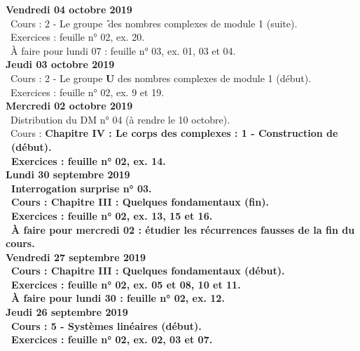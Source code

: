\documentclass[12pt,a4paper]{article}
\begin{document}
\noindent\textbf{Vendredi 04 octobre 2019}\\
\bu\ Cours : 2 - Le groupe \U\ des nombres complexes de module 1 (suite).\\
\bu\ Exercices : feuille n° 02, ex. 20.\\
\bu\ À faire pour lundi 07 : feuille n° 03, ex. 01, 03 et 04.\vspace{.4cm}\\ 

\noindent\textbf{Jeudi 03 octobre 2019}\\
\bu\ Cours : 2 - Le groupe \textbf{U} des nombres complexes de module 1 (début).\\
 \bu\ Exercices : feuille n° 02, ex. 9 et 19.\vspace{.4cm}\\

\noindent\textbf{\bf Mercredi 02 octobre 2019}\\
\bu\ Distribution du DM n° 04 (à rendre le 10 octobre).\\
\bu\ Cours : \bf Chapitre IV \rm : Le corps des complexes : 1 - Construction de \C\ (début).\\
 \bu\ Exercices : feuille n° 02, ex. 14.\vspace{.4cm}\\

\noindent\textbf{\bf Lundi 30 septembre 2019}\\
 \bu\ Interrogation surprise n° 03.\\
 \bu\ Cours : \bf Chapitre III \rm : Quelques fondamentaux (fin).\\
 \bu\ Exercices : feuille n° 02, ex. 13, 15 et 16.\\
\bu\ À faire pour mercredi 02 : étudier les récurrences fausses de la fin du cours.\vspace{.4cm}\\

 \noindent\textbf{Vendredi 27 septembre 2019}\\
 \bu\ Cours : \bf Chapitre III \rm : Quelques fondamentaux (début).\\
 \bu\ Exercices : feuille n° 02, ex. 05 et 08, 10 et 11.\\
 \bu\ À faire pour lundi 30 : feuille n° 02, ex. 12.\vspace{.4cm}\\
 
 \noindent\textbf{Jeudi 26 septembre 2019}\\
 \bu\ Cours : 5 - Systèmes linéaires (début).\\
 \bu\ Exercices : feuille n° 02, ex. 02, 03 et 07.\vspace{.4cm}\\
 
\end{document}
